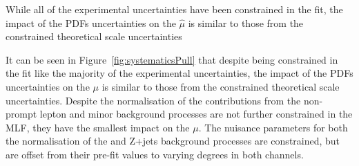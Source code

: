 While all of the experimental uncertainties have been constrained in the fit, the impact of the PDFs uncertainties on the $\hat{\mu}$ is similar to those from the constrained theoretical scale uncertainties

It can be seen in Figure~\ref{fig:systematicsPull} that despite being constrained in the fit like the majority of the experimental uncertainties, the impact of the PDFs uncertainties on the $\mu$ is similar to those from the constrained theoretical scale uncertainties.
Despite the normalisation of the contributions from the non-prompt lepton and minor background processes are not further constrained in the MLF, they have the smallest impact on the $\mu$.
The nuisance parameters for both the normalisation of the \ttbar and Z+jets background processes are constrained, but are offset from their pre-fit values to varying degrees in both channels.


